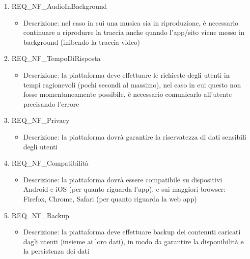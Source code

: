 \begin{enumerate}
	\item REQ\_NF\_AudioInBackground
		\begin{itemize}
			\item Descrizione: nel caso in cui una musica sia in riproduzione, è necessario continuare a riprodurre la traccia anche quando l'app/sito viene messo in background (inibendo la traccia video)
		\end{itemize}
	
	\item REQ\_NF\_TempoDiRisposta
		\begin{itemize}
			\item Descrizione: la piattaforma deve effettuare le richieste degli utenti in tempi ragionevoli (pochi secondi al massimo), nel caso in cui questo non fosse momentaneamente possibile, è necessario comunicarlo all'utente precisando l'errore
		\end{itemize}

	\item REQ\_NF\_Privacy
		\begin{itemize}
			\item Descrizione: la piattaforma dovrà garantire la riservatezza di dati sensibili degli utenti
		\end{itemize}

	\item REQ\_NF\_Compatibilità
		\begin{itemize}
			\item Descrizione: la piattaforma dovrà essere compatibile su dispositivi Android e iOS (per quanto riguarda l'app), e sui maggiori browser: Firefox, Chrome, Safari (per quanto riguarda la web app)
		\end{itemize}
	
	\item REQ\_NF\_Backup
		\begin{itemize}
			\item Descrizione: la piattaforma deve effettuare backup dei contenuti caricati dagli utenti (insieme ai loro dati), in modo da garantire la disponibilità e la persistenza dei dati
		\end{itemize}

\end{enumerate}
